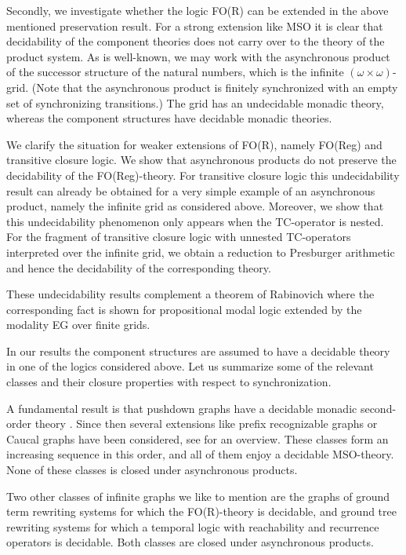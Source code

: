 \documentclass{LMCS}
\begin{document}
Secondly, we investigate whether the logic FO(R) can be extended in the 
above mentioned preservation result. For a strong extension like MSO
it is clear that decidability of the component theories does not carry over 
to the theory of the product system. As is well-known, we may work  with 
the asynchronous product of the successor structure of the natural 
numbers, which is the infinite $(\omega \times \omega)$-grid. 
(Note that the asynchronous product is finitely synchronized
with an empty set of synchronizing transitions.) The grid has an undecidable 
monadic theory, whereas the component structures have decidable monadic theories. 

We clarify the situation for weaker extensions of FO(R), 
namely FO(Reg) and transitive closure logic. We show that 
asynchronous products do not preserve the decidability of the FO(Reg)-theory. 
For transitive closure logic this undecidability result can already be obtained
for a very simple example of an asynchronous product, namely the infinite grid 
as considered above.
Moreover, we show that this undecidability phenomenon 
only appears when the TC-operator is nested. For the fragment of 
transitive closure logic with unnested TC-operators interpreted over the 
infinite grid,  we obtain a reduction to Presburger arithmetic and hence 
the decidability of the corresponding theory. 

These undecidability results complement a theorem of Rabinovich \cite{rabino07}
where the corresponding fact is shown for propositional modal logic extended by the
modality EG over finite grids.

In our results the component structures are assumed to have a decidable 
theory in one of the logics considered above. Let us summarize some of the
relevant classes and their closure properties with respect to synchronization.

A fundamental result is that pushdown graphs have
a decidable monadic second-order theory \cite{ms85}. Since then
several extensions like prefix recognizable graphs \cite{ca96} or 
Caucal graphs \cite{cau02} have been considered, see \cite{tho03} for an overview. 
These classes form an increasing sequence in this order, and
all of them enjoy a decidable MSO-theory. None of these classes is closed under 
asynchronous products. 

Two other classes of infinite graphs we like to mention are the graphs of 
ground term rewriting systems \cite{col02}  for which the FO(R)-theory is decidable, 
and ground tree rewriting systems \cite{loe02} 
for which a temporal logic with reachability and recurrence operators is decidable. 
Both classes are closed under asynchronous products.
\end{document}
